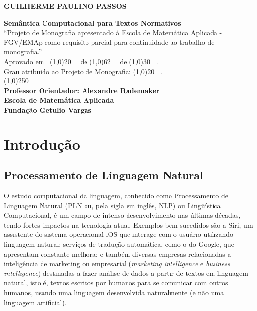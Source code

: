 \documentclass[12pt, a4paper, twoside]{article}
\newcommand{\supervisor}{Alexandre Rademaker}
\begin{document}
\begin{titlepage}
 \begin{center}
 
  {\bf \large \uppercase{Guilherme Paulino Passos}}\\[0.3cm]

  \vspace{25 mm}

  {\bf \large Semântica Computacional para Textos Normativos}\\[4.1cm]

  {“Projeto de Monografia apresentado à Escola de Matemática Aplicada  - FGV/EMAp como requisito parcial para continuidade ao trabalho de monografia.”}\\[5cm]


  {Aprovado em \ \line(1,0){20} \ \ de \line(1,0){62} \ \ de \line(1,0){30} \ .}\\[0.1cm]
  {Grau atribuido ao Projeto de Monografia: \line(1,0){20} \ . }\\[3cm]
  
  
  {\line(1,0){250}}\\
  {\bf Professor Orientador: \supervisor}\\[0.1cm]
  {\bf Escola de Matemática Aplicada}\\[0.1cm]
  {\bf Fundação Getulio Vargas}
 \end{center}
\end{titlepage}

\newpage\null\thispagestyle{empty}\newpage


\tableofcontents

\newpage

\section{Introdução}
\subsection{Processamento de Linguagem Natural} 

O estudo computacional da linguagem, conhecido como Processamento de Linguagem Natural (PLN ou, pela sigla em inglês, NLP) ou Lingüística Computacional, é um campo de intenso desenvolvimento nas últimas décadas, tendo fortes impactos na tecnologia atual. Exemplos bem sucedidos são a Siri, um assistente do sistema operacional iOS que interage com o usuário utilizando linguagem natural; serviços de tradução automática, como o do Google, que apresentam constante melhora; e também diversas empresas relacionadas a inteligência de marketing ou empresarial (\textit{marketing intelligence} e \textit{business intelligence}) destinadas a fazer análise de dados a partir de textos em linguagem natural, isto é, textos escritos por humanos para se comunicar com outros humanos, usando uma linguagem desenvolvida naturalmente (e não uma linguagem artificial).
\end{document}
